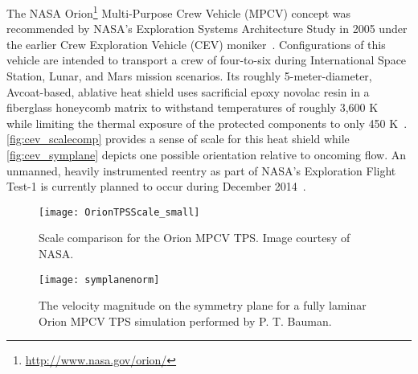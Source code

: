 \enlargethispage{1.70em}
%
The NASA Orion\footnote{\url{http://www.nasa.gov/orion/}} Multi-Purpose Crew
Vehicle (MPCV) concept was recommended by NASA's Exploration Systems
Architecture Study in 2005 under the earlier Crew Exploration Vehicle (CEV)
moniker~\citep[\textsection{}5]{NASA2005CEVReport}.  Configurations of this
vehicle are intended to transport a crew of four-to-six during International
Space Station, Lunar, and Mars mission scenarios.  Its roughly 5-meter-diameter,
Avcoat-based, ablative heat shield uses sacrificial epoxy novolac resin in a
fiberglass honeycomb matrix to withstand temperatures of roughly 3,600
K~\citep{SpaceCom20130722} while limiting the thermal exposure of the
protected components to only 450
K~\citep[\textsection{}5.3.1.3.7]{NASA2005CEVReport}.
\autoref{fig:cev_scalecomp} provides a sense of scale for this heat shield while
\autoref{fig:cev_symplane} depicts one possible orientation relative to oncoming
flow.  An unmanned, heavily instrumented reentry as part of NASA's
Exploration Flight Test-1 is currently planned to occur during December
2014~\citep{SpaceCom20140317}.

\begin{figure}[p]
  \centering
  \texttt{[image: OrionTPSScale\_small]}
  \caption[
    Scale comparison for the Orion MPCV thermal protection system.
  ]{%
    \label{fig:cev_scalecomp}
    Scale comparison for the Orion MPCV TPS\@.  Image courtesy of NASA.
  }
\end{figure}

\begin{figure}[p]
  \centering
  \texttt{[image: symplanenorm]}
  \caption[
    The velocity magnitude on the symmetry plane for a fully
    laminar Orion MPCV TPS simulation
  ]{%
    \label{fig:cev_symplane}
    The velocity magnitude on the symmetry plane for a fully
    laminar Orion MPCV TPS simulation performed by P. T. Bauman.
  }
\end{figure}


